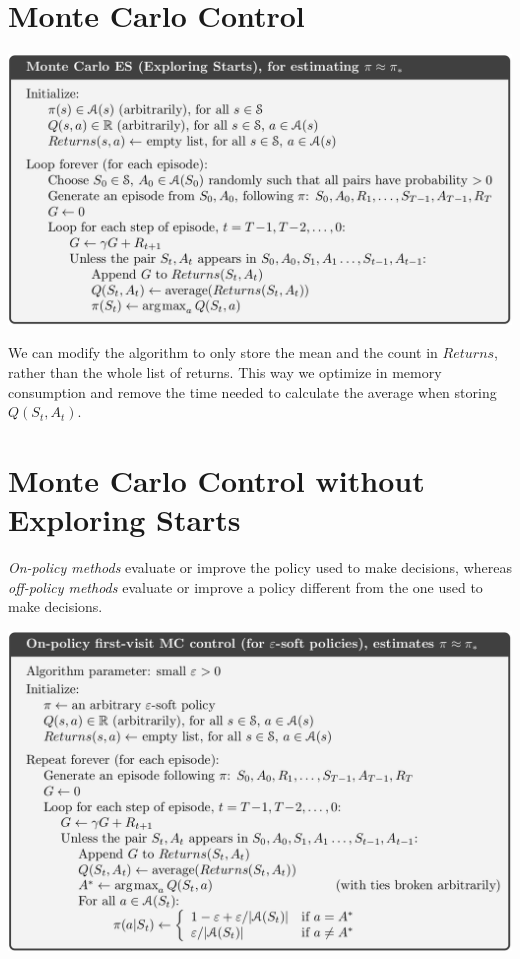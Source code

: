 \section{Monte Carlo Control}
\begin{center}
    \includegraphics[width=\textwidth]{img/alg_MCM_ES.png}
\end{center}
We can modify the algorithm to only store the mean and the count in $Returns$, rather than the whole list
of returns.
This way we optimize in memory consumption and remove the time needed to calculate the average when
storing $Q(S_t, A_t)$.

\section{Monte Carlo Control without Exploring Starts}
\emph{On-policy methods}\label{t:on_policy_methods} evaluate or improve the policy used to
make decisions, whereas \emph{off-policy methods}\label{t:off_policy_methods} evaluate or
improve a policy different from the one used to make decisions.
\begin{center}
    \includegraphics[width=\textwidth]{img/alg_on_policy_first_visit_MC_control.png}
\end{center}

